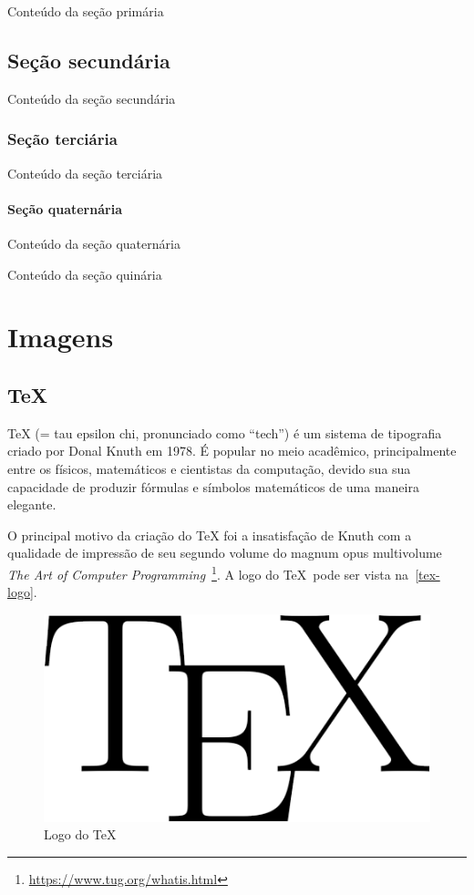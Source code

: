 \documentclass[
	12pt,    %
	oneside, %
	a4paper, %
	chapter=TITLE, %
	section=TITLE, %
	sumario=tradicional, %
	english, %
	brazil   %
] {abntex2}
\begin{document}
	Conteúdo da seção primária	
	
	\section{Seção secundária}\label{sec:secundaria}
	
	Conteúdo da seção secundária
	
	\subsection{Seção terciária}\label{sec:terciária}
	
	Conteúdo da seção terciária
	
	\subsubsection{Seção quaternária}\label{sec:quaternária}
	
	Conteúdo da seção quaternária
	
	\label{sec:quinária}
	
	Conteúdo da seção quinária
	
	\chapter{Imagens}\label{sec:imagens}
	\section{TeX}
	TeX (= tau epsilon chi, pronunciado como \enquote{tech}) é um sistema de tipografia criado por Donal Knuth em 1978. É popular no meio acadêmico, principalmente entre os físicos, matemáticos e cientistas da computação, devido sua sua capacidade de produzir fórmulas e símbolos matemáticos de uma maneira elegante.
	
	O principal motivo da criação do TeX foi a insatisfação de Knuth com a qualidade de impressão de seu segundo volume do magnum opus multivolume \textit{The Art of Computer Programming}~\footnote{\url{https://www.tug.org/whatis.html}}. A logo do \TeX \ pode ser vista na~\autoref{tex-logo}.
	
	\begin{figure}[htb]		
		\caption{Logo do \TeX}
		\label{tex-logo}
		\centering
		\includegraphics[scale=.2]{./figuras/tex-logo.png}
	\end{figure}
	
\end{document}

